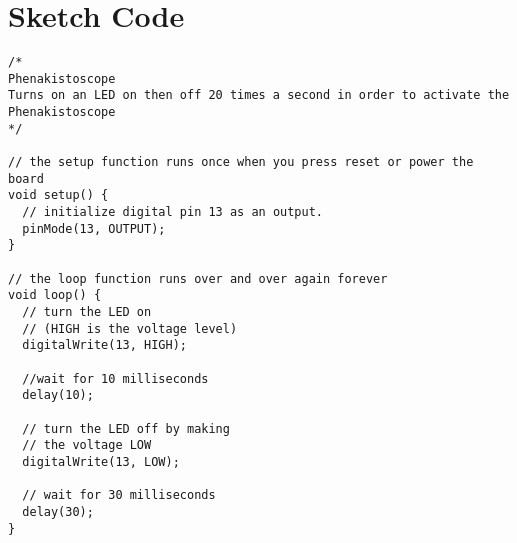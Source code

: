 \newpage
\section*{Sketch Code}
\label{sketch:exp5}
\begin{lstlisting}
/*
Phenakistoscope
Turns on an LED on then off 20 times a second in order to activate the Phenakistoscope
*/

// the setup function runs once when you press reset or power the board
void setup() {
  // initialize digital pin 13 as an output.
  pinMode(13, OUTPUT);
}

// the loop function runs over and over again forever
void loop() {
  // turn the LED on 
  // (HIGH is the voltage level)
  digitalWrite(13, HIGH);
	
  //wait for 10 milliseconds
  delay(10);
	
  // turn the LED off by making 
  // the voltage LOW
  digitalWrite(13, LOW);    
	            
  // wait for 30 milliseconds              
  delay(30);
}
\end{lstlisting}